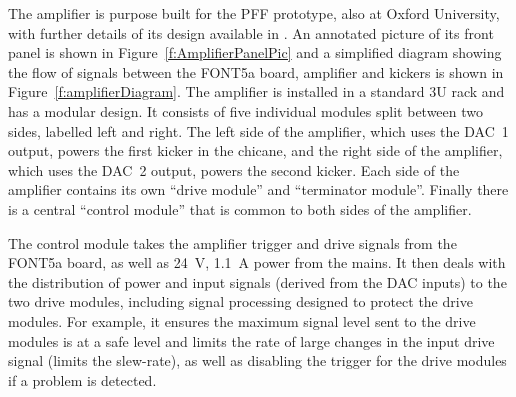 

The amplifier is purpose built for the PFF prototype, also at Oxford University, with further details of its design available in \cite{colinCLIC16}. An annotated picture of its front panel is shown in Figure~\ref{f:AmplifierPanelPic} and a simplified diagram showing the flow of signals between the FONT5a board, amplifier and kickers is shown in Figure~\ref{f:amplifierDiagram}.
The amplifier is installed in a standard 3U rack and has a modular design. It consists of five individual modules split between two sides, labelled left and right. The left side of the amplifier, which uses the DAC~1 output, powers the first kicker in the chicane, and the right side of the amplifier, which uses the DAC~2 output, powers the second kicker. Each side of the amplifier contains its own ``drive module'' and ``terminator module''. Finally there is a central ``control module'' that is common to both sides of the amplifier.




The control module takes the amplifier trigger and drive signals from the FONT5a board, as well as 24~V, 1.1~A power from the mains.
It then deals with the distribution of power and input signals (derived from the DAC inputs) to the two drive modules, including signal processing designed to protect the drive modules. For example, it ensures the maximum signal level sent to the drive modules is at a safe level and limits the rate of large changes in the input drive signal (limits the slew-rate), as well as disabling the trigger for the drive modules if a problem is detected.

